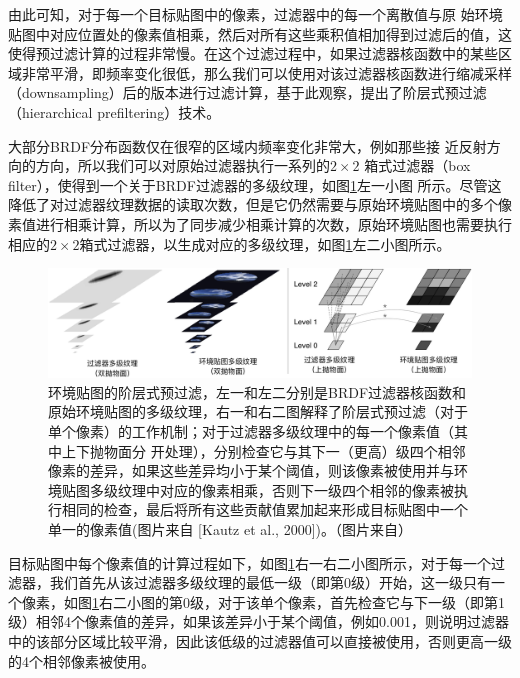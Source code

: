 由此可知，对于每一个目标贴图中的像素，过滤器中的每一个离散值与原 始环境贴图中对应位置处的像素值相乘，然后对所有这些乘积值相加得到过滤后的值，这使得预过滤计算的过程非常慢。在这个过滤过程中，如果过滤器核函数中的某些区域非常平滑，即频率变化很低，那么我们可以使用对该过滤器核函数进行缩减采样（downsampling）后的版本进行过滤计算，基于此观察，\cite{a:Aunifiedapproachtoprefilteredenvironmentmaps}提出了阶层式预过滤（hierarchical prefiltering）技术。

大部分BRDF分布函数仅在很窄的区域内频率变化非常大，例如那些接 近反射方向的方向，所以我们可以对原始过滤器执行一系列的$2\times 2$ 箱式过滤器（box filter），使得到一个关于BRDF过滤器的多级纹理，如图\ref{f:pl-pre-filtering-4}左一小图 所示。尽管这降低了对过滤器纹理数据的读取次数，但是它仍然需要与原始环境贴图中的多个像素值进行相乘计算，所以为了同步减少相乘计算的次数，原始环境贴图也需要执行相应的$2\times 2$箱式过滤器，以生成对应的多级纹理，如图\ref{f:pl-pre-filtering-4}左二小图所示。

\begin{figure}
\begin{fullwidth}
	\includegraphics[width=\thewidth]{figures/pl/pre-filtering-4}
	\caption{环境贴图的阶层式预过滤，左一和左二分别是BRDF过滤器核函数和原始环境贴图的多级纹理，右一和右二图解释了阶层式预过滤（对于单个像素）的工作机制；对于过滤器多级纹理中的每一个像素值（其中上下抛物面分 开处理），分别检查它与其下一（更高）级四个相邻像素的差异，如果这些差异均小于某个阈值，则该像素被使用并与环境贴图多级纹理中对应的像素相乘，否则下一级四个相邻的像素被执行相同的检查，最后将所有这些贡献值累加起来形成目标贴图中一个单一的像素值(图片来自 [Kautz et al., 2000])。（图片来自\cite{a:Aunifiedapproachtoprefilteredenvironmentmaps}）}
	\label{f:pl-pre-filtering-4}
\end{fullwidth}
\end{figure}

目标贴图中每个像素值的计算过程如下，如图\ref{f:pl-pre-filtering-4}右一右二小图所示，对于每一个过滤器，我们首先从该过滤器多级纹理的最低一级（即第0级）开始，这一级只有一个像素，如图\ref{f:pl-pre-filtering-4}右二小图的第0级，对于该单个像素，首先检查它与下一级（即第1级）相邻4个像素值的差异，如果该差异小于某个阈值，例如0.001，则说明过滤器中的该部分区域比较平滑，因此该低级的过滤器值可以直接被使用，否则更高一级的4个相邻像素被使用。

